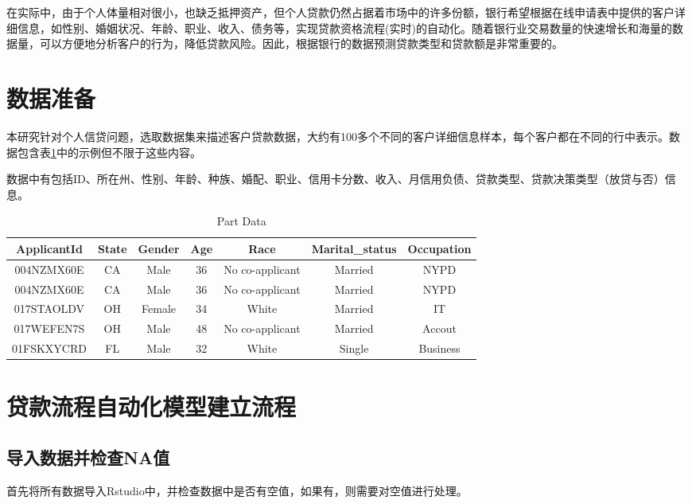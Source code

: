 \documentclass[UTF8]{ctexart}
\begin{document}
在实际中，由于个人体量相对很小，也缺乏抵押资产，但个人贷款仍然占据着市场中的许多份额，银行希望根据在线申请表中提供的客户详细信息，如性别、婚姻状况、年龄、职业、收入、债务等，实现贷款资格流程(实时)的自动化。随着银行业交易数量的快速增长和海量的数据量，可以方便地分析客户的行为，降低贷款风险。因此，根据银行的数据预测贷款类型和贷款额是非常重要的。



\section{数据准备}

本研究针对个人信贷问题，选取数据集来描述客户贷款数据，大约有100多个不同的客户详细信息样本，每个客户都在不同的行中表示。数据包含表\ref{tab:addlabel}中的示例但不限于这些内容。

数据中有包括ID、所在州、性别、年龄、种族、婚配、职业、信用卡分数、收入、月信用负债、贷款类型、贷款决策类型（放贷与否）信息。


\begin{table}[htbp]
	\centering
	\caption{Part Data }
	\vspace{0.3cm}
	\begin{tabular}{ccccccc}
		\toprule[1.5pt]
		ApplicantId & State & Gender & Age & Race  & Marital\_status & Occupation \\
		\midrule[1.0pt]
		004NZMX60E & CA    & Male  & 36    & No co-applicant & Married & NYPD \\
		004NZMX60E & CA    & Male  & 36    & No co-applicant & Married & NYPD \\
		017STAOLDV & OH    & Female & 34    & White & Married & IT \\
		017WEFEN7S & OH    & Male  & 48    & No co-applicant & Married & Accout \\
		01FSKXYCRD & FL    & Male  & 32    & White & Single & Business \\
		\bottomrule[1.5pt]
	\end{tabular}%
	\label{tab:addlabel}%
\end{table}%

\section{贷款流程自动化模型建立流程}
\subsection{导入数据并检查NA值}
首先将所有数据导入Rstudio中，并检查数据中是否有空值，如果有，则需要对空值进行处理。
\end{document}
